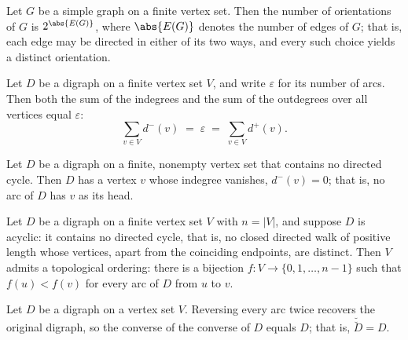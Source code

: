\begin{theorem}
\label{card_orientations}
\leanok
{}
Let $G$ be a simple graph on a finite vertex set. Then the number of orientations of $G$
is $2^{\abs{E(G)}}$, where $\abs{E(G)}$ denotes the number of edges of $G$; that is,
each edge may be directed in either of its two ways, and every such choice yields a
distinct orientation.
\end{theorem}

\begin{theorem}
\label{sum_indegree_eq_arcCount}
\leanok
{}
Let $D$ be a digraph on a finite vertex set $V$, and write $\varepsilon$ for its number
of arcs. Then both the sum of the indegrees and the sum of the outdegrees over all
vertices equal $\varepsilon$:
\[
\sum_{v \in V} d^{-}(v) \;=\; \varepsilon \;=\; \sum_{v \in V} d^{+}(v).
\]
\end{theorem}

\begin{theorem}
\label{exists_indegree_zero_of_acyclic}
\leanok
{}
Let $D$ be a digraph on a finite, nonempty vertex set that contains no directed cycle.
Then $D$ has a vertex $v$ whose indegree vanishes, $d^{-}(v) = 0$; that is, no arc of
$D$ has $v$ as its head.
\end{theorem}

\begin{theorem}
\label{exists_topological_ordering}
\leanok
{}
Let $D$ be a digraph on a finite vertex set $V$ with $n = |V|$, and suppose $D$ is
acyclic: it contains no directed cycle, that is, no closed directed walk of positive
length whose vertices, apart from the coinciding endpoints, are distinct. Then $V$
admits a topological ordering: there is a bijection $f \colon V \to \{0, 1, \dots,
n-1\}$ such that $f(u) < f(v)$ for every arc of $D$ from $u$ to $v$.
\end{theorem}

\begin{theorem}
\label{converse_converse}
\leanok
{}
Let $D$ be a digraph on a vertex set $V$. Reversing every arc twice recovers the
original digraph, so the converse of the converse of $D$ equals $D$; that is,
$\breve{\breve{D}} = D$.
\end{theorem}


